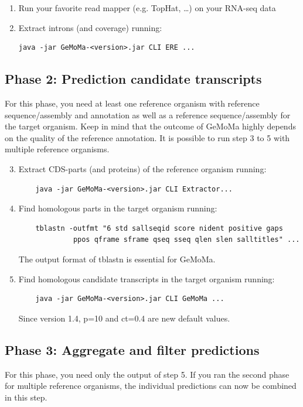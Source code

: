 \documentclass{article}
\begin{document}
\begin{enumerate}
\item	Run your favorite read mapper (e.g. TopHat, \ldots) on your RNA-seq data
\item	Extract introns (and coverage) running: 
\begin{verbatim}
java -jar GeMoMa-<version>.jar CLI ERE ...
\end{verbatim}
\end{enumerate}

\subsection{Phase 2: Prediction candidate transcripts}
For this phase, you need at least one reference organism with reference sequence/assembly and annotation as well as a reference sequence/assembly for the target organism.
Keep in mind that the outcome of GeMoMa highly depends on the quality of the reference annotation.
It is possible to run step 3 to 5 with multiple reference organisms.

\begin{enumerate}
\setcounter{enumi}{2}
\item Extract CDS-parts (and proteins) of the reference organism running:
	\begin{verbatim}
	java -jar GeMoMa-<version>.jar CLI Extractor...
	\end{verbatim}
\item Find homologous parts in the target organism running: 
	\begin{verbatim}
	tblastn -outfmt "6 std sallseqid score nident positive gaps
	         ppos qframe sframe qseq sseq qlen slen salltitles" ...
	\end{verbatim}
	The output format of tblastn is essential for GeMoMa.
\item Find homologous candidate transcripts in the target organism running:
	\begin{verbatim}
	java -jar GeMoMa-<version>.jar CLI GeMoMa ...
	\end{verbatim}
	Since version 1.4, p=10 and ct=0.4 are new default values.
\end{enumerate}

\subsection{Phase 3: Aggregate and filter predictions}
For this phase, you need only the output of step 5.
If you ran the second phase for multiple reference organisms, the individual predictions can now be combined in this step.
\end{document}
